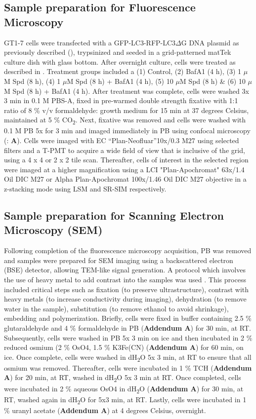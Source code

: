\subsection{Sample preparation for Fluorescence Microscopy}
 GT1-7 cells were transfected with a GFP-LC3-RFP-LC3$\Delta$G DNA plasmid as previously described (), trypsinized and seeded in a grid-patterned matTek culture dish with glass bottom. After overnight culture, cells were treated as described in . Treatment groups included a (1) Control, (2) BafA1 (4 h), (3) 1 $\mu$M Spd (8 h), (4) 1 $\mu$M Spd (8 h) + BafA1 (4 h), (5) 10 $\mu$M Spd (8 h) \& (6) 10 $\mu$M Spd (8 h) + BafA1 (4 h). After treatment was complete, cells were washed 3x 3 min in 0.1 M PBS-A, fixed in pre-warmed double strength fixative with 1:1 ratio of 8 \% v/v formaldehyde: growth medium for 15 min at 37 degrees Celsius, maintained at 5 \% CO\textsubscript{2}. Next, fixative was removed and cells were washed with 0.1 M PB 5x for 3 min and imaged immediately in PB using confocal microscopy (: \textbf{A}). Cells were imaged with EC “Plan-Neofluar”10x/0.3 M27 using selected filters and a T-PMT to acquire a wide field of view that is inclusive of the grid, using a 4 x 4 or 2 x 2 tile scan. Thereafter, cells of interest in the selected region were imaged at a higher magnification using a LCI "Plan-Apochromat" 63x/1.4 Oil DIC M27 or Alpha Plan-Apochromat 100x/1.46 Oil DIC M27 objective in a z-stacking mode using LSM and SR-SIM respectively. 

\subsection{Sample preparation for Scanning Electron Microscopy (SEM)}\label{sec:sample preparation for SEM}
Following completion of the fluorescence microscopy acquisition, PB was removed and samples were prepared for SEM imaging using a backscattered electron (BSE) detector, allowing TEM-like signal generation. A protocol which involves the use of heavy metal to add contrast into the samples was used \citep{Russell2017}. This process included critical steps such as fixation (to preserve ultrastructure), contrast with heavy metals (to increase conductivity during imaging), dehydration (to remove water in the sample), substitution (to remove ethanol to avoid shrinkage), embedding and polymerization. Briefly, cells were fixed in buffer containing 2.5 \% glutaraldehyde and 4 \% formaldehyde in PB (\textbf{Addendum A}) for 30 min, at RT. Subsequently, cells were washed in PB 5x 3 min on ice and then incubated in 2 \% reduced osmium (2 \% OsO4, 1.5 \% K3Fe(CN) (\textbf{Addendum A}) for 60 min, on ice. Once complete, cells were washed in dH\textsubscript{2}O 5x 3 min, at RT to ensure that all osmium was removed. Thereafter, cells were incubated in 1 \% TCH (\textbf{Addendum A}) for 20 min, at RT, washed in dH\textsubscript{2}O 5x 3 min at RT. Once completed, cells were incubated in 2 \% aqueous OsO4 in dH\textsubscript{2}O (\textbf{Addendum A}) for 30 min, at RT, washed again in dH\textsubscript{2}O for 5x3 min, at RT. Lastly, cells were incubated in 1 \% uranyl acetate (\textbf{Addendum A}) at 4 degrees Celsius, overnight.

